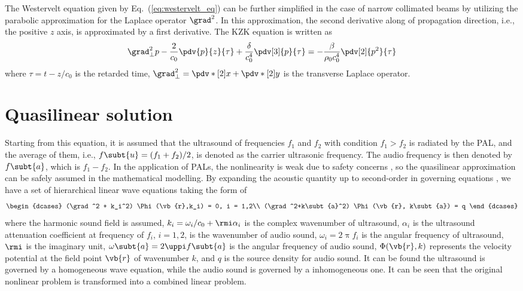 The Westervelt equation given by Eq.~(\ref{eq:westervelt_eq}) can be further simplified in the case of narrow collimated beams by utilizing the parabolic approximation for the Laplace operator $\grad^2$.
In this approximation, the second derivative along of propagation direction, i.e., the positive $z$ axis, is approximated by a first derivative. 
The KZK equation is written as \cite{Aanonsen1984DistortionHarmonicGeneration}
\begin{equation}
    \grad^2_\bot p
    - \frac{2}{c_0}\pdv{p}{z}{\tau}
      + \frac{\delta}{c_0^4}\pdv[3]{p}{\tau}
    = 
    -\frac{\beta}{\rho_0c_0^4}\pdv[2]{p^2}{\tau}
\end{equation}
where $\tau = t-z/c_0$ is the retarded time, $\grad^2_\bot = \pdv*[2]{}{x} + \pdv*[2]{}{y}$ is the transverse Laplace operator. 

\section{Quasilinear solution}
\label{sec:sound_field_quasi}
Starting from this equation, it is assumed that the ultrasound of frequencies $f_1$ and $f_2$ with condition $f_1>f_2$ is radiated by the PAL, and the average of them, i.e., $f\subt{u} = (f_1+f_2)/2$, is denoted as the carrier ultrasonic frequency.
The audio frequency is then denoted by $f\subt{a}$, which is $f_1-f_2$.
In the application of PALs, the nonlinearity is weak due to safety concerns \cite{Gan2012ReviewParametricAcoustic, Lawton2001DamageHumanHearing, Pompei2002SoundUltrasoundParametric}, so the quasilinear approximation can be safely assumed in the mathematical modelling.
By expanding the acoustic quantity up to second-order in governing equations \cite{Silva2013DifferencefrequencyGenerationNonlinear}, 
we have a set of hierarchical linear wave equations taking the form of \cite{Zhong2021FieldWesterveltFar}
\begin{equation}
    \begin{dcases}
        (\grad^2 + k_i^2) \Phi(\vb{r},k_i) = 0, i = 1,2\\
        (\grad^2+k\subt{a}^2) \Phi(\vb{r}, k\subt{a}) = q
    \end{dcases}
    \label{eq:quasilinear_eq}
\end{equation}
where the harmonic sound field is assumed, $k_i= \omega_i/c_0 + \rmi \alpha_i $ is the complex wavenumber of ultrasound, $\alpha_i$ is the ultrasound attenuation coefficient at frequency of $f_i$, $i=1,2$,  is the wavenumber of audio sound, $\omega_i = 2\uppi f_i$ is the angular frequency of ultrasound, $\rmi$ is the imaginary unit, $\omega\subt{a}=2\uppi f\subt{a}$ is the angular frequency of audio sound, $\Phi(\vb{r},k)$ represents the velocity potential at the field point $\vb{r}$ of wavenumber $k$, and $q$ is the source density for audio sound. 
It can be found the ultrasound is governed by a homogeneous wave equation, 
while the audio sound is governed by a inhomogeneous one.
It can be seen that the original nonlinear problem is transformed into a combined linear problem.

